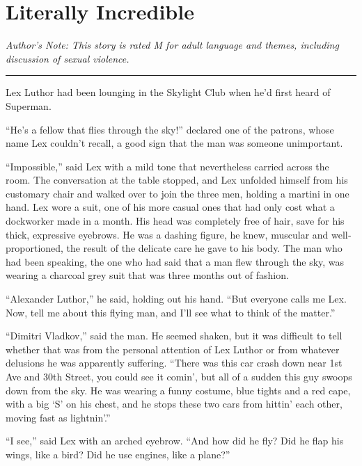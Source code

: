 \documentclass[ebook,12pt]{memoir}
\begin{document}
\mainmatter         %


\chapter{Literally Incredible}\label{literally-incredible}

\emph{Author's Note: This story is rated M for adult language and
themes, including discussion of sexual violence.}

\begin{center}\rule{0.5\linewidth}{\linethickness}\end{center}

Lex Luthor had been lounging in the Skylight Club when he'd first heard
of Superman.

``He's a fellow that flies through the sky!'' declared one of the
patrons, whose name Lex couldn't recall, a good sign that the man was
someone unimportant.

``Impossible,'' said Lex with a mild tone that nevertheless carried
across the room. The conversation at the table stopped, and Lex unfolded
himself from his customary chair and walked over to join the three men,
holding a martini in one hand. Lex wore a suit, one of his more casual
ones that had only cost what a dockworker made in a month. His head was
completely free of hair, save for his thick, expressive eyebrows. He was
a dashing figure, he knew, muscular and well‐proportioned, the result of
the delicate care he gave to his body. The man who had been speaking,
the one who had said that a man flew through the sky, was wearing a
charcoal grey suit that was three months out of fashion.

``Alexander Luthor,'' he said, holding out his hand. ``But everyone
calls me Lex. Now, tell me about this flying man, and I'll see what to
think of the matter.''

``Dimitri Vladkov,'' said the man. He seemed shaken, but it was
difficult to tell whether that was from the personal attention of Lex
Luthor or from whatever delusions he was apparently suffering. ``There
was this car crash down near 1st Ave and 30th Street, you could see it
comin', but all of a sudden this guy swoops down from the sky. He was
wearing a funny costume, blue tights and a red cape, with a big `S' on
his chest, and he stops these two cars from hittin' each other, moving
fast as lightnin'.''

``I see,'' said Lex with an arched eyebrow. ``And how did he fly? Did he
flap his wings, like a bird? Did he use engines, like a plane?''
\end{document}
